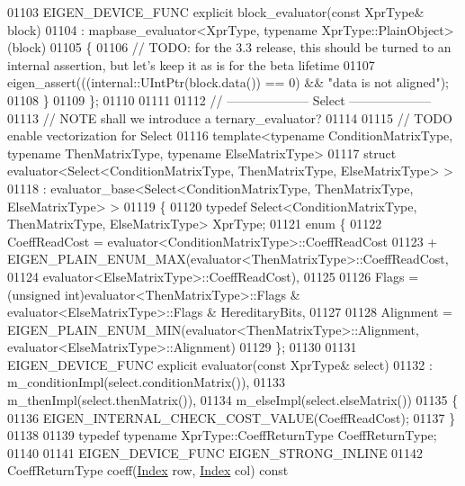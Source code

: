 \begin{DoxyCode}
01103   EIGEN\_DEVICE\_FUNC \textcolor{keyword}{explicit} block\_evaluator(\textcolor{keyword}{const} XprType& block)
01104     : mapbase\_evaluator<XprType, typename XprType::PlainObject>(block) 
01105   \{
01106     \textcolor{comment}{// TODO: for the 3.3 release, this should be turned to an internal assertion, but let's keep it as is
       for the beta lifetime}
01107     eigen\_assert(((internal::UIntPtr(block.data()) %
       == 0) && \textcolor{stringliteral}{"data is not aligned"});
01108   \}
01109 \};
01110 
01111 
01112 \textcolor{comment}{// -------------------- Select --------------------}
01113 \textcolor{comment}{// NOTE shall we introduce a ternary\_evaluator?}
01114 
01115 \textcolor{comment}{// TODO enable vectorization for Select}
01116 \textcolor{keyword}{template}<\textcolor{keyword}{typename} ConditionMatrixType, \textcolor{keyword}{typename} ThenMatrixType, \textcolor{keyword}{typename} ElseMatrixType>
01117 \textcolor{keyword}{struct }evaluator<Select<ConditionMatrixType, ThenMatrixType, ElseMatrixType> >
01118   : evaluator\_base<Select<ConditionMatrixType, ThenMatrixType, ElseMatrixType> >
01119 \{
01120   \textcolor{keyword}{typedef} Select<ConditionMatrixType, ThenMatrixType, ElseMatrixType> XprType;
01121   \textcolor{keyword}{enum} \{
01122     CoeffReadCost = evaluator<ConditionMatrixType>::CoeffReadCost
01123                   + EIGEN\_PLAIN\_ENUM\_MAX(evaluator<ThenMatrixType>::CoeffReadCost,
01124                                          evaluator<ElseMatrixType>::CoeffReadCost),
01125 
01126     Flags = (\textcolor{keywordtype}{unsigned} int)evaluator<ThenMatrixType>::Flags & evaluator<ElseMatrixType>::Flags & 
      HereditaryBits,
01127     
01128     Alignment = EIGEN\_PLAIN\_ENUM\_MIN(evaluator<ThenMatrixType>::Alignment, 
      evaluator<ElseMatrixType>::Alignment)
01129   \};
01130 
01131   EIGEN\_DEVICE\_FUNC \textcolor{keyword}{explicit} evaluator(\textcolor{keyword}{const} XprType& select)
01132     : m\_conditionImpl(select.conditionMatrix()),
01133       m\_thenImpl(select.thenMatrix()),
01134       m\_elseImpl(select.elseMatrix())
01135   \{
01136     EIGEN\_INTERNAL\_CHECK\_COST\_VALUE(CoeffReadCost);
01137   \}
01138  
01139   \textcolor{keyword}{typedef} \textcolor{keyword}{typename} XprType::CoeffReturnType CoeffReturnType;
01140 
01141   EIGEN\_DEVICE\_FUNC EIGEN\_STRONG\_INLINE
01142   CoeffReturnType coeff(\hyperlink{namespace_eigen_a62e77e0933482dafde8fe197d9a2cfde}{Index} row, \hyperlink{namespace_eigen_a62e77e0933482dafde8fe197d9a2cfde}{Index} col)\textcolor{keyword}{ const}

\end{DoxyCode}

